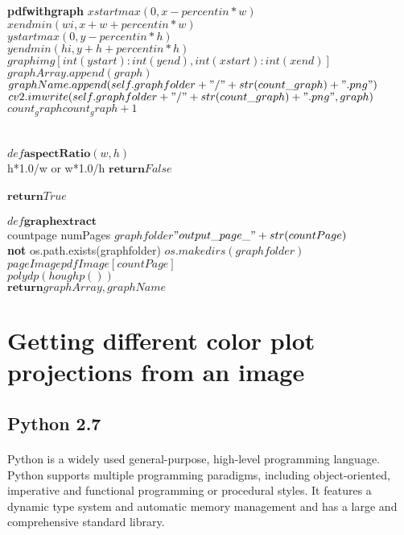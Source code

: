 \documentclass[12pts]{scrreprt}
\begin{document}
\begin{pseudocode}{\textbf{pdfwithgraph}}{ }
$xstart$\GETS$max(0,x-percentin*w)$\\
$xend$\GETS$min(wi,x+w+percentin*w)$\\
$ystart$\GETS$max(0,y-percentin*h)$\\
$yend$\GETS$min(hi,y+h+percentin*h)$\\
$graph$\GETS$img[int(ystart):int(yend),int(xstart):int(xend)]$\\
$graphArray.append(graph)$\\
$graphName.append(self.graphfolder+"/"+str(count\_graph)+".png")$\\
$cv2.imwrite(self.graphfolder+"/"+str(count\_graph)+".png",graph)$\\
$count_graph$\GETS$count_graph + 1$\\
\END 
\END
\END
\END\\
\\
$def \textbf{aspectRatio}(w,h)$\\
\IF h*1.0/w or w*1.0/h \THEN
\BEGIN
$\textbf{return} False$\\
\END \\
$\textbf{return} True$\\
\\
$def \textbf{graphextract}$\\
\FOR countpage \TO numPages\DO
\BEGIN
$graphfolder$\GETS$"output\_page\_"+str(countPage)$\\
\IF \textbf{not} os.path.exists(graphfolder) \THEN
\BEGIN 
$os.makedirs(graphfolder)$\\
$pageImage$\GETS$pdfImage[countPage]$\\
$polydp(houghp())$\\
\END 
$\textbf{return} graphArray,graphName$\\
\END 
\end{pseudocode}


\section{Getting different color plot projections from an image}
\subsection{Python 2.7}
\paragraph{}
Python is a widely used general-purpose, high-level programming language.
Python supports multiple programming paradigms, including object-oriented, imperative and functional programming or procedural styles. It features a dynamic type system and automatic memory management and has a large and comprehensive standard library.
\end{document}
